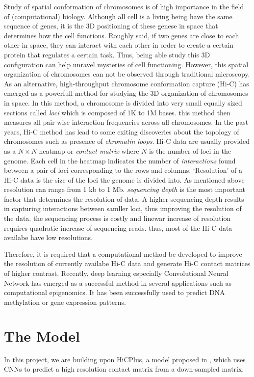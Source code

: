 \documentclass{article}
\begin{document}
Study of spatial conformation of chromosomes is
of high importance in the field of (computational)
biology. Although all cell is a living being
have the same sequence of genes, it is the 
3D positioning of these genese in space that
determines how the cell functions.
Roughly said,
if two genes are close to each other in
space, they can interact with each other
in order to create a certain protein that
regulates a certain task.
Thus, being
able study this 3D configuration can help
unravel mysteries of cell functioning.
However, this spatial organization of chromosomes
can not be observed through traditional 
microscopy. As an alternative,
high-throughput chromosome conformation capture
(Hi-C) has emerged as
a powerfull method for studying the
3D organization of chromosomes in space.
In this method, a chromosome is divided into
very small equally sized
sections called \textit{loci}
which is composed of 1K to 1M bases.
this method then
measures all pair-wise interaction frequencies 
across all chromosomes. 
In the past years, Hi-C method has lead to some
exiting discoveries about the topology of 
chromosomes such as presence of \textit{chromatin
loops}.
Hi-C data are usually provided as a $N \times N$
heatmap or \textit{contact matrix} where $N$ is 
the number of loci in the genome. Each cell in 
the heatmap indicates the number of \textit{interactions}
found between a pair of loci corresponding to the
rows and columns. `Resolution' of a Hi-C data
is the size of the loci the genome is
divided into.
As mentioned above
resolution can range from 1 kb to 1 Mb.
\textit{sequencing depth} is the most
important factor that determines the resolution
of data. A higher sequencing depth results in
capturing interactions between samller loci,
thus improving the resolution of the data.
the sequencing process is costly and 
linewar increase of resolution requires
quadratic increase of sequencing reads.
thus, most of the Hi-C data availabe have
low resolutions.

Therefore, it is required that a computational
method be developed to improve the resolution of
currently availabe Hi-C data and generate Hi-C
contact matrices of higher contrast.
Recently, deep learning 
especially Convolutional Neural Network
has emerged as a successful
method in several applications such as 
computational epigenomics. It has been
successfully used to predict DNA methylation
or gene expression patterns.

\section{The Model}
In this project, we are building upon
HiCPlus, a model proposed in 
\cite{zhang2018enhancing}, which
uses CNNs
to predict a high resolution contact
matrix from a down-sampled matrix.
\end{document}
